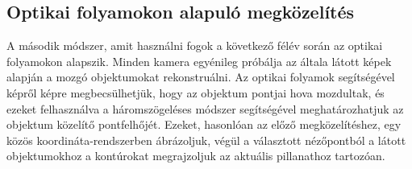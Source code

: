 \subsection{Optikai folyamokon alapuló megközelítés}

A második módszer, amit használni fogok a következő félév során az optikai folyamokon alapszik. Minden kamera egyénileg próbálja az általa látott képek alapján a mozgó objektumokat rekonstruálni. Az optikai folyamok segítségével képről képre megbecsülhetjük, hogy az objektum pontjai hova mozdultak, és ezeket felhasználva a háromszögeléses módszer segítségével meghatározhatjuk az objektum közelítő pontfelhőjét. Ezeket, hasonlóan az előző megközelítéshez, egy közös koordináta-rendszerben ábrázoljuk, végül a választott nézőpontból a látott objektumokhoz a kontúrokat megrajzoljuk az aktuális pillanathoz tartozóan.

